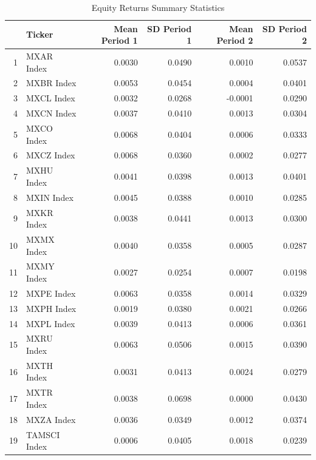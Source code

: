 \documentclass[11pt,preprint, authoryear]{elsarticle}
\numberwithin{equation}{section}
\numberwithin{figure}{section}
\numberwithin{table}{section}
\begin{document}
\begin{longtable}{rlrrrr}
\caption{Equity Returns Summary Statistics \label{summarystats}} \\ 
  \hline
 & Ticker & Mean Period 1 & SD Period 1 & Mean Period 2 & SD Period 2 \\ 
  \hline
1 & MXAR Index & 0.0030 & 0.0490 & 0.0010 & 0.0537 \\ 
  2 & MXBR Index & 0.0053 & 0.0454 & 0.0004 & 0.0401 \\ 
  3 & MXCL Index & 0.0032 & 0.0268 & -0.0001 & 0.0290 \\ 
  4 & MXCN Index & 0.0037 & 0.0410 & 0.0013 & 0.0304 \\ 
  5 & MXCO Index & 0.0068 & 0.0404 & 0.0006 & 0.0333 \\ 
  6 & MXCZ Index & 0.0068 & 0.0360 & 0.0002 & 0.0277 \\ 
  7 & MXHU Index & 0.0041 & 0.0398 & 0.0013 & 0.0401 \\ 
  8 & MXIN Index & 0.0045 & 0.0388 & 0.0010 & 0.0285 \\ 
  9 & MXKR Index & 0.0038 & 0.0441 & 0.0013 & 0.0300 \\ 
  10 & MXMX Index & 0.0040 & 0.0358 & 0.0005 & 0.0287 \\ 
  11 & MXMY Index & 0.0027 & 0.0254 & 0.0007 & 0.0198 \\ 
  12 & MXPE Index & 0.0063 & 0.0358 & 0.0014 & 0.0329 \\ 
  13 & MXPH Index & 0.0019 & 0.0380 & 0.0021 & 0.0266 \\ 
  14 & MXPL Index & 0.0039 & 0.0413 & 0.0006 & 0.0361 \\ 
  15 & MXRU Index & 0.0063 & 0.0506 & 0.0015 & 0.0390 \\ 
  16 & MXTH Index & 0.0031 & 0.0413 & 0.0024 & 0.0279 \\ 
  17 & MXTR Index & 0.0038 & 0.0698 & 0.0000 & 0.0430 \\ 
  18 & MXZA Index & 0.0036 & 0.0349 & 0.0012 & 0.0374 \\ 
  19 & TAMSCI Index & 0.0006 & 0.0405 & 0.0018 & 0.0239 \\ 
   \hline
\hline
\end{longtable}
\end{document}
